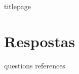 \documentclass[a4paper, 12pt]{article}
\begin{document}
	{titlepage}
	\section{Respostas}
	{questions}
	\newpage
	{references}
\end{document}
